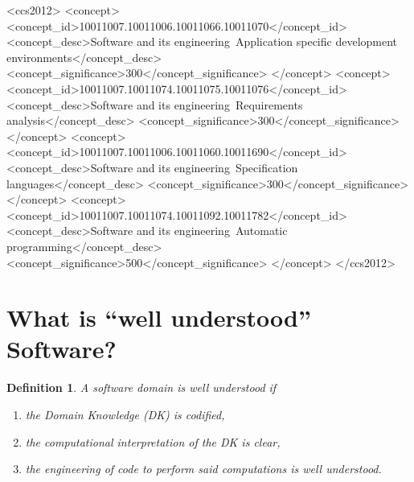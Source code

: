 \documentclass[sigconf,review]{acmart}
\begin{document}
\begin{CCSXML}
<ccs2012>
   <concept>
       <concept_id>10011007.10011006.10011066.10011070</concept_id>
       <concept_desc>Software and its engineering~Application specific development environments</concept_desc>
       <concept_significance>300</concept_significance>
       </concept>
   <concept>
       <concept_id>10011007.10011074.10011075.10011076</concept_id>
       <concept_desc>Software and its engineering~Requirements analysis</concept_desc>
       <concept_significance>300</concept_significance>
       </concept>
   <concept>
       <concept_id>10011007.10011006.10011060.10011690</concept_id>
       <concept_desc>Software and its engineering~Specification languages</concept_desc>
       <concept_significance>300</concept_significance>
       </concept>
   <concept>
       <concept_id>10011007.10011074.10011092.10011782</concept_id>
       <concept_desc>Software and its engineering~Automatic programming</concept_desc>
       <concept_significance>500</concept_significance>
       </concept>
 </ccs2012>
\end{CCSXML}



\newtheorem{defn}{Definition}

\maketitle

\section{What is ``well understood'' Software?}\label{ch:wellUnderstood}

\begin{defn}
A software domain is \emph{well understood} if
\begin{enumerate}
\item the Domain Knowledge (DK) is codified,
\item the computational interpretation of the DK is clear,
\item the engineering of code to perform said computations is well
understood.
\end{enumerate}
\end{defn}
\end{document}
